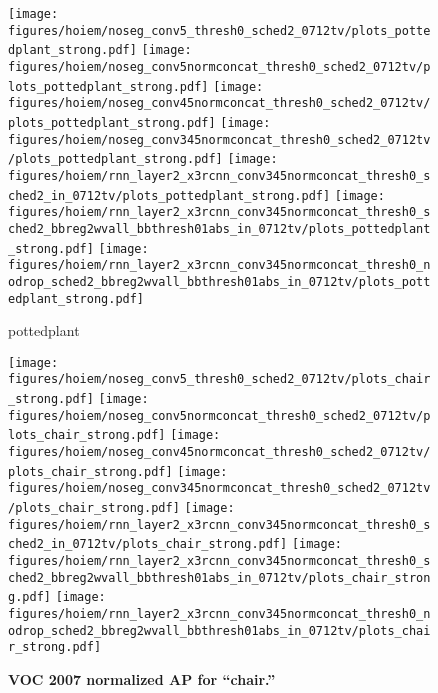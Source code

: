 \begin{figure}[t]
  \begin{center}
   \texttt{[image: figures/hoiem/noseg\_conv5\_thresh0\_sched2\_0712tv/plots\_pottedplant\_strong.pdf]}
   \texttt{[image: figures/hoiem/noseg\_conv5normconcat\_thresh0\_sched2\_0712tv/plots\_pottedplant\_strong.pdf]}
   \texttt{[image: figures/hoiem/noseg\_conv45normconcat\_thresh0\_sched2\_0712tv/plots\_pottedplant\_strong.pdf]}
   \texttt{[image: figures/hoiem/noseg\_conv345normconcat\_thresh0\_sched2\_0712tv/plots\_pottedplant\_strong.pdf]}
   \texttt{[image: figures/hoiem/rnn\_layer2\_x3rcnn\_conv345normconcat\_thresh0\_sched2\_in\_0712tv/plots\_pottedplant\_strong.pdf]}
   \texttt{[image: figures/hoiem/rnn\_layer2\_x3rcnn\_conv345normconcat\_thresh0\_sched2\_bbreg2wvall\_bbthresh01abs\_in\_0712tv/plots\_pottedplant\_strong.pdf]}
   \texttt{[image: figures/hoiem/rnn\_layer2\_x3rcnn\_conv345normconcat\_thresh0\_nodrop\_sched2\_bbreg2wvall\_bbthresh01abs\_in\_0712tv/plots\_pottedplant\_strong.pdf]}
  \end{center}
  \vspace{-12pt}
  \caption{pottedplant
  }
  \label{fig:hoiem}
\end{figure}

\begin{figure}[t]
  \begin{center}
   \texttt{[image: figures/hoiem/noseg\_conv5\_thresh0\_sched2\_0712tv/plots\_chair\_strong.pdf]}
   \texttt{[image: figures/hoiem/noseg\_conv5normconcat\_thresh0\_sched2\_0712tv/plots\_chair\_strong.pdf]}
   \texttt{[image: figures/hoiem/noseg\_conv45normconcat\_thresh0\_sched2\_0712tv/plots\_chair\_strong.pdf]}
   \texttt{[image: figures/hoiem/noseg\_conv345normconcat\_thresh0\_sched2\_0712tv/plots\_chair\_strong.pdf]}
   \texttt{[image: figures/hoiem/rnn\_layer2\_x3rcnn\_conv345normconcat\_thresh0\_sched2\_in\_0712tv/plots\_chair\_strong.pdf]}
   \texttt{[image: figures/hoiem/rnn\_layer2\_x3rcnn\_conv345normconcat\_thresh0\_sched2\_bbreg2wvall\_bbthresh01abs\_in\_0712tv/plots\_chair\_strong.pdf]}
   \texttt{[image: figures/hoiem/rnn\_layer2\_x3rcnn\_conv345normconcat\_thresh0\_nodrop\_sched2\_bbreg2wvall\_bbthresh01abs\_in\_0712tv/plots\_chair\_strong.pdf]}
  \end{center}
  \vspace{-12pt}
  \caption{\textbf{VOC 2007 normalized AP for ``chair.''}
  }
  \label{fig:hoiem}
\end{figure}

